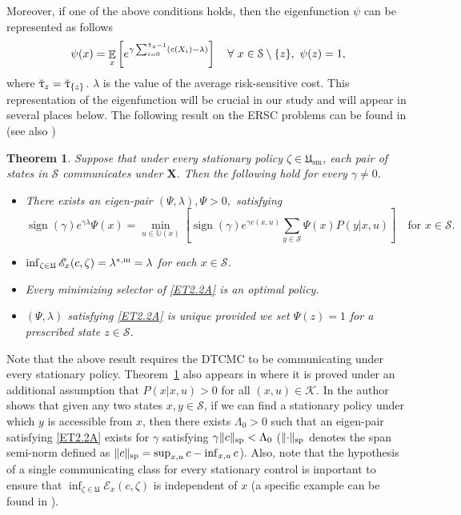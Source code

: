 \documentclass[notitlepage,11pt,reqno]{amsart}
\numberwithin{equation}{section}
\theoremstyle{plain}
\newtheorem{theorem}{Theorem}[section]
\theoremstyle{definition}
\theoremstyle{remark}
\newcommand{\Act}{{\mathds{U}}}
\newcommand{\uuptau}{{\Breve{\uptau}}}
\newcommand{\sE}{{\mathscr{E}}}     %
\newcommand{\sK}{{\mathscr{K}}}
\newcommand{\cS}{{\mathcal{S}}}     %
\newcommand{\Uadm}{\mathfrak{U}}
\newcommand{\Usm}{\mathfrak{U}_{\mathrm{sm}}}
\newcommand{\lamstrdm}{\lambda^{*,{\rm m}}}
\DeclareMathOperator{\Exp}{\mathbb{E}} %
\newcommand{\norm}[1]{\lVert#1\rVert}
\DeclareMathOperator*{\sgn}{sign}
\begin{document}
Moreover, if one of the above conditions holds, then the eigenfunction $\psi$ can be represented as follows \cite{MR2510639,MR1893292}
\begin{equation}\label{E2.5}
\psi(x)=\Exp_x\left[e^{\gamma \sum_{i=0}^{\uuptau_z-1} (c(X_i)-\lambda)}\right] \quad \forall \ x\in \cS\setminus\{z\}, \ \psi(z)=1,
\end{equation}
where $\uuptau_z=\uuptau_{\{z\}}$. $\lambda$ is the value of the average risk-sensitive cost. This representation of the eigenfunction will be crucial in our study and will appear in several places below. The following result on the ERSC problems can be found in \cite[Theorem~3.1]{MR1893292} (see also \cite{MR1687362,MR1466928})
\begin{theorem}\label{T2.2}
Suppose that under every stationary policy $\zeta\in\Usm$, each pair of states in $\cS$ communicates under $\textbf{X}$. Then the following hold for every $\gamma\neq 0$.
\begin{itemize}
\item[(i)] There exists an eigen-pair $(\Psi, \lambda), \Psi>0,$ satisfying
\begin{equation}\label{ET2.2A}
\sgn(\gamma)e^{\gamma\lambda}\Psi(x) = \min_{u\in\Act(x)}\left[\sgn(\gamma)e^{\gamma c(x,u)}\sum_{y\in\cS} \Psi(x)P(y|x,u)\right]\quad\text{for}\,\, x\in \cS.
\end{equation}
\item[(ii)] $\inf_{\zeta\in \Uadm}\sE_x(c, \zeta)=\lamstrdm=\lambda$ for each $x\in\cS$.
\item[(iii)] Every minimizing selector of \eqref{ET2.2A} is an optimal policy.
\item[(iv)] $(\Psi, \lambda)$ satisfying \eqref{ET2.2A} is unique provided we set $\Psi(z)=1$ for a prescribed state $z\in\cS$.
\end{itemize}
\end{theorem}
Note that the above result requires the DTCMC to be communicating under every stationary policy. Theorem~\ref{T2.2} also appears in \cite{MR1732397}
where it is proved under an additional assumption that $P(x|x, u)>0$ for all $(x, u)\in\sK$.
 In \cite{MR1973378} the author shows that given any two states $x, y\in\cS$, if we can find a 
stationary policy under which $y$ is accessible from $x$, then there exists
$\Lambda_0>0$ such that an eigen-pair satisfying \eqref{ET2.2A}
exists for $\gamma$ satisfying
$\gamma \norm{c}_{\rm sp}<\Lambda_0$ ($\norm{\cdot}_{\rm sp}$ denotes the span  semi-norm  defined as $\norm{c}_{\rm sp}=\sup_{x, u} c- \inf_{x, u} c$). Also, note that the hypothesis of a single communicating class for
every stationary control is important to ensure that 
$\inf_{\zeta\in \Uadm}\sE_x(c, \zeta)$ is independent of $x$
(a specific example can be found in \cite[Proposition~3.1]{MR1687362}).
\end{document}
